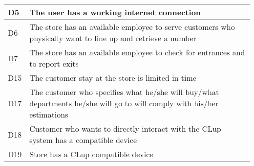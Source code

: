 \begin{center}
{\begin{longtable}{L{2cm}L{12cm}}
             D5 & The user has a working internet connection \\
            \hline
             D6 & The store has an available employee to serve customers who physically want to line up and retrieve a number \\
            \hline
             D7 & The store has an available employee to check for entrances and to report exits \\
            \hline
             D15 & The customer stay at the store is limited in time \\
            \hline
             D17 & The customer who specifies what he/she will buy/what departments he/she will go to will comply with his/her estimations \\
            \hline
             D18 & Customer who wants to directly interact with the CLup system has a compatible device \\
            \hline
             D19 & Store has a CLup compatible device \\
            \hline
        \end{longtable}}


\end{center}
